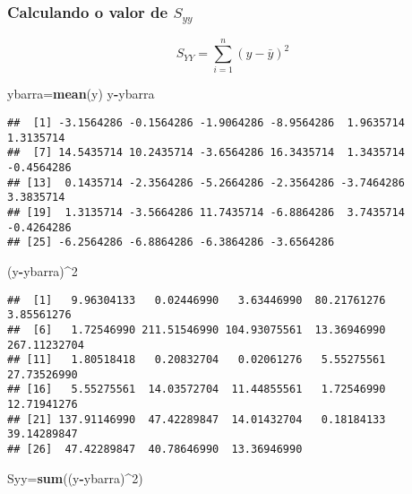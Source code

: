 \documentclass[
]{article}
\newenvironment{Shaded}{\begin{snugshade}}{\end{snugshade}}
\newcommand{\DecValTok}[1]{\textcolor[rgb]{0.00,0.00,0.81}{#1}}
\newcommand{\KeywordTok}[1]{\textcolor[rgb]{0.13,0.29,0.53}{\textbf{#1}}}
\newcommand{\NormalTok}[1]{#1}
\newcommand{\OperatorTok}[1]{\textcolor[rgb]{0.81,0.36,0.00}{\textbf{#1}}}
\begin{document}
\hypertarget{calculando-o-valor-de-s_yy}{%
\subsubsection{\texorpdfstring{Calculando o valor de
\(S_{yy}\)}{Calculando o valor de S\_\{yy\}}}\label{calculando-o-valor-de-s_yy}}

\[S_{YY} =  \sum_{i=1}^n (y - \bar{y})^2\]

\begin{Shaded}
\begin{Highlighting}[]
\NormalTok{ybarra=}\KeywordTok{mean}\NormalTok{(y)}
\NormalTok{y}\OperatorTok{-}\NormalTok{ybarra}
\end{Highlighting}
\end{Shaded}

\begin{verbatim}
##  [1] -3.1564286 -0.1564286 -1.9064286 -8.9564286  1.9635714  1.3135714
##  [7] 14.5435714 10.2435714 -3.6564286 16.3435714  1.3435714 -0.4564286
## [13]  0.1435714 -2.3564286 -5.2664286 -2.3564286 -3.7464286  3.3835714
## [19]  1.3135714 -3.5664286 11.7435714 -6.8864286  3.7435714 -0.4264286
## [25] -6.2564286 -6.8864286 -6.3864286 -3.6564286
\end{verbatim}

\begin{Shaded}
\begin{Highlighting}[]
\NormalTok{(y}\OperatorTok{-}\NormalTok{ybarra)}\OperatorTok{^}\DecValTok{2}
\end{Highlighting}
\end{Shaded}

\begin{verbatim}
##  [1]   9.96304133   0.02446990   3.63446990  80.21761276   3.85561276
##  [6]   1.72546990 211.51546990 104.93075561  13.36946990 267.11232704
## [11]   1.80518418   0.20832704   0.02061276   5.55275561  27.73526990
## [16]   5.55275561  14.03572704  11.44855561   1.72546990  12.71941276
## [21] 137.91146990  47.42289847  14.01432704   0.18184133  39.14289847
## [26]  47.42289847  40.78646990  13.36946990
\end{verbatim}

\begin{Shaded}
\begin{Highlighting}[]
\NormalTok{Syy=}\KeywordTok{sum}\NormalTok{((y}\OperatorTok{-}\NormalTok{ybarra)}\OperatorTok{^}\DecValTok{2}\NormalTok{)}
\end{Highlighting}
\end{Shaded}
\end{document}
